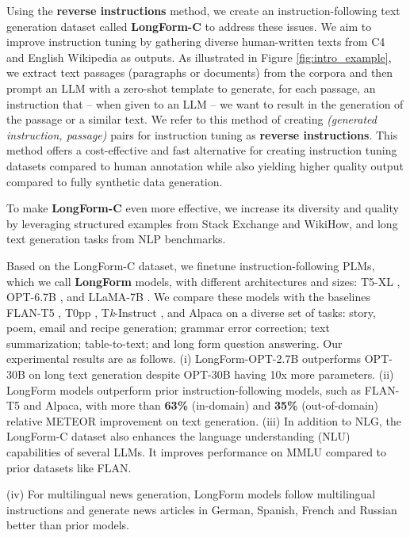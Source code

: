 Using the \textbf{reverse instructions} method, we create an instruction-following text generation dataset called \textbf{LongForm-C} to address these issues. We aim to improve instruction tuning by gathering diverse human-written texts from C4 and English Wikipedia as outputs. As illustrated in Figure \ref{fig:intro_example}, we extract text passages (paragraphs or documents) from the corpora and then prompt an LLM with a zero-shot template to generate, for each passage, an instruction that -- when given to an LLM -- we want to result in the generation of the passage or a similar text. We refer to this method of creating
\textit{(generated instruction, passage)} pairs for instruction tuning as \textbf{reverse instructions}. This method offers a cost-effective and fast alternative for creating instruction tuning datasets compared to human annotation while also yielding higher quality output compared to fully synthetic data generation.

To make \textbf{LongForm-C} even more effective, we increase its diversity and quality by leveraging structured examples from Stack Exchange and Wi\-ki\-How, and long text generation tasks from NLP benchmarks.

Based on the LongForm-C dataset, we finetune instruction-following PLMs, which we call \textbf{LongForm} models, with different architectures and sizes: T5-XL \cite{JMLR:v21:20-074_raffel_t5}, OPT-6.7B \cite{zhang2022opt}, and LLaMA-7B \cite{touvron2023llama}. We compare these models with the baselines FLAN-T5 \cite{chung2022scaling}, T0pp \cite{sanh2022multitask},
	T\textit{k}-Instruct \cite{wang-etal-2022-super}, and Alpaca on a diverse set of tasks: story, poem, email and recipe generation; grammar error correction; text summarization; table-to-text; and long form question answering. Our experimental results are as follows. (i) LongForm-OPT-2.7B outperforms OPT-30B on long text generation despite OPT-30B having 10x more parameters. (ii) LongForm models outperform prior instruction-following models, such as FLAN-T5 and Alpaca, with more than \textbf{63\%} (in-domain) and \textbf{35\%} (out-of-domain) relative METEOR improvement on text generation. (iii) In addition to NLG, the LongForm-C dataset also enhances the language understanding (NLU) capabilities of several LLMs. It improves performance on MMLU \cite{hendryckstest2021} compared to prior datasets like FLAN.

(iv) For multilingual news generation, LongForm models follow multilingual instructions and generate news articles in German, Spanish, French and Russian better than prior models.

